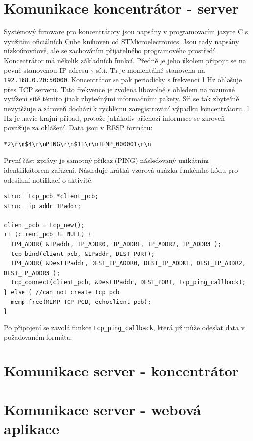 \section{Komunikace koncentrátor - server}
Systémový firmware pro koncentrátory jsou napsány v programovacím jazyce C s využitím oficiálních Cube knihoven od STMicroelectronics. Jsou tady napsány nízkoúrovňově, ale se zachováním přijatelného programového prostředí. Koncentrátor má několik základních funkcí. Předně je jeho úkolem připojit se na pevně stanovenou IP adresu v síti. Ta je momentálně stanovena na \texttt{192.168.0.20:50000}. Koncentrátor se pak periodicky s frekvencí 1 Hz ohlašuje přes TCP serveru. Tato frekvence je zvolena libovolně s ohledem na rozumné vytížení sítě těmito jinak zbytečnými informačními pakety. Síť se tak zbytečně nevytěžuje a zároveň dochází k rychlému zaregistrování výpadku koncentrátoru. 1 Hz je navíc krajní případ, protože jakákoliv příchozí informace se zároveň považuje za ohlášení. Data jsou v RESP formátu:

\begin{verbatim}
*2\r\n$4\r\nPING\r\n$11\r\nTEMP_000001\r\n
\end{verbatim}

První část zprávy je samotný příkaz (PING) následovaný unikátním identifikátorem zařízení. Následuje krátká vzorová ukázka funkčního kódu pro odesílání notifikací o aktivitě.

\begin{verbatim}
struct tcp_pcb *client_pcb;
struct ip_addr IPaddr;

client_pcb = tcp_new();
if (client_pcb != NULL) {
  IP4_ADDR( &IPaddr, IP_ADDR0, IP_ADDR1, IP_ADDR2, IP_ADDR3 );
  tcp_bind(client_pcb, &IPaddr, DEST_PORT);
  IP4_ADDR( &DestIPaddr, DEST_IP_ADDR0, DEST_IP_ADDR1, DEST_IP_ADDR2, DEST_IP_ADDR3 );
  tcp_connect(client_pcb, &DestIPaddr, DEST_PORT, tcp_ping_callback);
} else { //can not create tcp pcb
  memp_free(MEMP_TCP_PCB, echoclient_pcb);
}
\end{verbatim}

Po připojení se zavolá funkce \texttt{tcp\_ping\_callback}, která již může odeslat data v požadovaném formátu.

\section{Komunikace server - koncentrátor}

\section{Komunikace server - webová aplikace}
